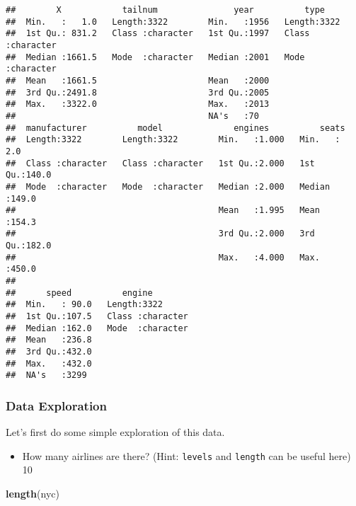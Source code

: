 \documentclass[
]{article}
\newenvironment{Shaded}{\begin{snugshade}}{\end{snugshade}}
\newcommand{\KeywordTok}[1]{\textcolor[rgb]{0.13,0.29,0.53}{\textbf{#1}}}
\newcommand{\NormalTok}[1]{#1}
\providecommand{\tightlist}{%
  \setlength{\itemsep}{0pt}\setlength{\parskip}{0pt}}
\begin{document}
\begin{verbatim}
##        X            tailnum               year          type          
##  Min.   :   1.0   Length:3322        Min.   :1956   Length:3322       
##  1st Qu.: 831.2   Class :character   1st Qu.:1997   Class :character  
##  Median :1661.5   Mode  :character   Median :2001   Mode  :character  
##  Mean   :1661.5                      Mean   :2000                     
##  3rd Qu.:2491.8                      3rd Qu.:2005                     
##  Max.   :3322.0                      Max.   :2013                     
##                                      NA's   :70                       
##  manufacturer          model              engines          seats      
##  Length:3322        Length:3322        Min.   :1.000   Min.   :  2.0  
##  Class :character   Class :character   1st Qu.:2.000   1st Qu.:140.0  
##  Mode  :character   Mode  :character   Median :2.000   Median :149.0  
##                                        Mean   :1.995   Mean   :154.3  
##                                        3rd Qu.:2.000   3rd Qu.:182.0  
##                                        Max.   :4.000   Max.   :450.0  
##                                                                       
##      speed          engine         
##  Min.   : 90.0   Length:3322       
##  1st Qu.:107.5   Class :character  
##  Median :162.0   Mode  :character  
##  Mean   :236.8                     
##  3rd Qu.:432.0                     
##  Max.   :432.0                     
##  NA's   :3299
\end{verbatim}

\hypertarget{data-exploration}{%
\subsubsection{Data Exploration}\label{data-exploration}}

Let's first do some simple exploration of this data.

\begin{itemize}
\tightlist
\item
  How many airlines are there? (Hint: \texttt{levels} and
  \texttt{length} can be useful here) 10
\end{itemize}

\begin{Shaded}
\begin{Highlighting}[]
\KeywordTok{length}\NormalTok{(nyc)}
\end{Highlighting}
\end{Shaded}
\end{document}
